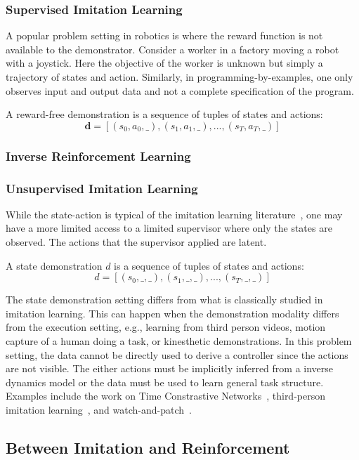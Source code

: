 \subsubsection{Supervised Imitation Learning}
A popular problem setting in robotics is where the reward function is not available to the demonstrator. Consider a worker in a factory moving a robot with a joystick. Here the objective of the worker is unknown but simply a trajectory of states and action. Similarly, in programming-by-examples, one only observes input and output data and not a complete specification of the program.

\begin{definition}
A reward-free demonstration is a sequence of tuples of states and actions:
\[\mathbf{d} = [(s_0,a_0,\_),(s_1,a_1,\_),...,(s_T,a_T,\_)]\]
\end{definition}



\subsubsection{Inverse Reinforcement Learning}


\subsubsection{Unsupervised Imitation Learning}
While the state-action is typical of the imitation learning literature~\cite{osa2018algorithmic}, one may have a more limited access to a limited supervisor where only the states are observed. The actions that the supervisor applied are latent.

\begin{definition}
A state demonstration $d$ is a sequence of tuples of states and actions:
\[d = [(s_0,\_,\_),(s_1,\_,\_),...,(s_T,\_,\_)]\]
\end{definition}

The state demonstration setting differs from what is classically studied in imitation learning. 
This can happen when the demonstration modality differs from the execution setting, e.g., learning from third person videos, motion capture of a human doing a task, or kinesthetic demonstrations. 
In this problem setting, the data cannot be directly used to derive a controller since the actions are not visible.
The either actions must be implicitly inferred from a inverse dynamics model or the data must be used to learn general task structure.
Examples include the work on Time Constrastive Networks~\cite{sermanet2017time}, third-person imitation learning~\cite{stadie2017third}, and watch-and-patch~\cite{wu2018watch}.

\subsection*{Between Imitation and Reinforcement}




